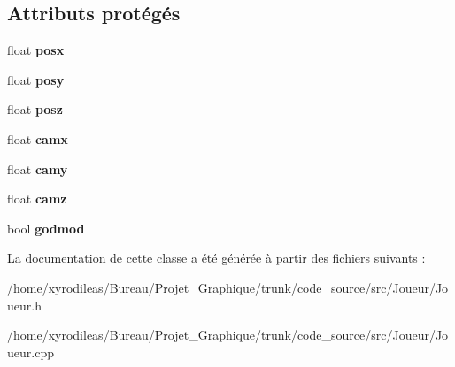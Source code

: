 \subsection*{Attributs protégés}
\begin{DoxyCompactItemize}
\item 
\hypertarget{classJoueur_aa6f729cb2f752814353d67b934da0fcc}{float {\bfseries posx}}\label{classJoueur_aa6f729cb2f752814353d67b934da0fcc}

\item 
\hypertarget{classJoueur_a5c41b447033ee563da583db447934ec6}{float {\bfseries posy}}\label{classJoueur_a5c41b447033ee563da583db447934ec6}

\item 
\hypertarget{classJoueur_a54ce6f968bd1e8ae328b9af265c70e5f}{float {\bfseries posz}}\label{classJoueur_a54ce6f968bd1e8ae328b9af265c70e5f}

\item 
\hypertarget{classJoueur_aa7dcfa3ec6a3b1858f026c6dbab97d9d}{float {\bfseries camx}}\label{classJoueur_aa7dcfa3ec6a3b1858f026c6dbab97d9d}

\item 
\hypertarget{classJoueur_af1853f3becb17602b775f27d5abaf044}{float {\bfseries camy}}\label{classJoueur_af1853f3becb17602b775f27d5abaf044}

\item 
\hypertarget{classJoueur_a516bd192f0d2407f037834f781d95d76}{float {\bfseries camz}}\label{classJoueur_a516bd192f0d2407f037834f781d95d76}

\item 
\hypertarget{classJoueur_ac8d5dfba7ccd45c19df99b3aae83c897}{bool {\bfseries godmod}}\label{classJoueur_ac8d5dfba7ccd45c19df99b3aae83c897}

\end{DoxyCompactItemize}


La documentation de cette classe a été générée à partir des fichiers suivants \-:\begin{DoxyCompactItemize}
\item 
/home/xyrodileas/\-Bureau/\-Projet\-\_\-\-Graphique/trunk/code\-\_\-source/src/\-Joueur/Joueur.\-h\item 
/home/xyrodileas/\-Bureau/\-Projet\-\_\-\-Graphique/trunk/code\-\_\-source/src/\-Joueur/Joueur.\-cpp\end{DoxyCompactItemize}
